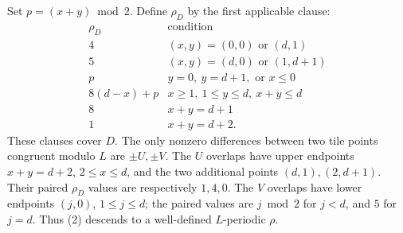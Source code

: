 \documentclass[11pt]{article}
\begin{document}
Set $p=(x+y)\bmod2$. Define $\rho_D$ by the first applicable clause:
\[
\begin{array}{c|l}
\rho_D&\text{condition}\\\hline
4&(x,y)=(0,0)\text{ or }(d,1)\\
5&(x,y)=(d,0)\text{ or }(1,d+1)\\
p&y=0,\ y=d+1,\text{ or }x\le0\\
8(d-x)+p&x\ge1,\ 1\le y\le d,\ x+y\le d\\
8&x+y=d+1\\
1&x+y=d+2.
\end{array}                                                    \tag{2}
\]
These clauses cover $D$. The only nonzero differences between two tile
points congruent modulo $L$ are $\pm U,\pm V$. The $U$ overlaps have
upper endpoints $x+y=d+2$, $2\le x\le d$, and the two additional
points $(d,1),(2,d+1)$. Their paired $\rho_D$ values are respectively
$1,4,0$. The $V$ overlaps have lower endpoints $(j,0)$,
$1\le j\le d$; the paired values are $j\bmod2$ for $j<d$, and $5$
for $j=d$. Thus (2) descends to a well-defined $L$-periodic $\rho$.
\end{document}
